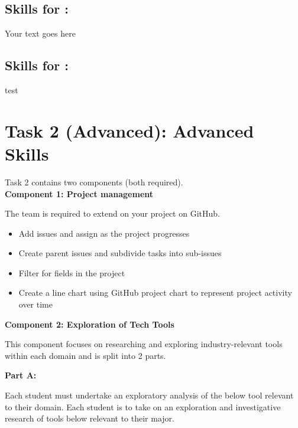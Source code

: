 \documentclass[a4paper, 11pt]{report}
\begin{document}
\subsection{Skills for \majC: \studC}

Your text goes here

\subsection{Skills for \majD: \studD}

test



\newpage
\section{Task 2 (Advanced): Advanced Skills}

Task 2 contains two components (both required).\\[2mm]

\textbf{Component 1: Project management}

The team is required to extend on your project on GitHub.

\begin{itemize}
    \item Add issues and assign as the project progresses
    \item Create parent issues and subdivide tasks into sub-issues
    \item Filter for fields in the project
    \item Create a line chart using GitHub project chart to represent project activity over time
\end{itemize} 

\vspace{4ex}

\textbf{Component 2: Exploration of Tech Tools}

This component focuses on researching and exploring industry-relevant tools within each domain and is split into 2 parts.

\vspace{2ex}


\textbf{Part A:}

Each student must undertake an exploratory analysis of the below tool relevant to their domain. 
Each student is to take on an exploration and investigative research of tools below relevant to their major. 
\end{document}
